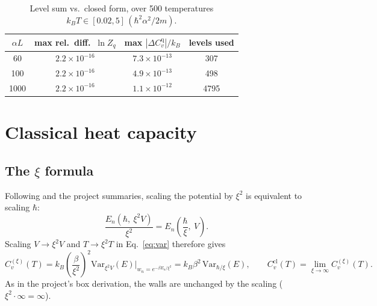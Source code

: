\documentclass[11pt]{article}
\numberwithin{equation}{section}
\newcommand{\Cq}{C_v^{\mathrm{q}}}
\newcommand{\Ccl}{C_v^{\mathrm{cl}}}
\newcommand{\kB}{k_{B}}
\begin{document}
\begin{table}[h]
\centering
\caption{Level sum vs.\ closed form, over 500 temperatures $\kB T\in[0.02,5]\,(\hbar^2\alpha^2/2m)$.}
\label{tab:Zcheck}
\begin{tabular}{cccc}
\toprule
$\alpha L$ & max rel.\ diff.\ $\ln Z_q$ & max $|\Delta\Cq|/\kB$ & levels used\\
\midrule
60 & $2.2\times10^{-16}$ & $7.3\times10^{-13}$ & 307\\
100 & $2.2\times10^{-16}$ & $4.9\times10^{-13}$ & 498\\
1000 & $2.2\times10^{-16}$ & $1.1\times10^{-12}$ & 4795\\
\bottomrule
\end{tabular}
\end{table}

\section{Classical heat capacity}
\label{sec:classical}

\subsection{The \texorpdfstring{$\xi$}{xi} formula}
Following \cite{gelbwaser2018} and the project summaries, scaling the potential by $\xi^2$ is equivalent to scaling $\hbar$:
\begin{equation}
\frac{E_n\!\left(\hbar,\ \xi^2V\right)}{\xi^2}=E_n\!\left(\frac{\hbar}{\xi},\ V\right).
\label{eq:xiid}
\end{equation}
Scaling $V\to\xi^2V$ and $T\to\xi^2T$ in Eq.~\eqref{eq:var} therefore gives
\begin{equation}
C_v^{(\xi)}(T)=\kB\left(\frac{\beta}{\xi^2}\right)^2\mathrm{Var}_{\xi^2V}(E)\Big|_{w_n=e^{-\beta E_n/\xi^2}}=\kB\beta^2\,\mathrm{Var}_{\hbar/\xi}(E),\qquad
\Ccl(T)=\lim_{\xi\to\infty}C_v^{(\xi)}(T).
\label{eq:xiformula}
\end{equation}
As in the project's box derivation, the walls are unchanged by the scaling ($\xi^2\cdot\infty=\infty$).
\end{document}
